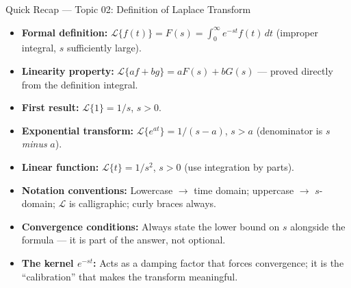 \documentclass[12pt,a4paper]{article}
\begin{document}
\begin{learnbox}{Quick Recap --- Topic 02: Definition of Laplace Transform}
\begin{itemize}[leftmargin=1.2cm]
  \item \textbf{Formal definition:}
        $\mathcal{L}\{f(t)\} = F(s) = \int_0^\infty e^{-st} f(t)\, dt$
        (improper integral, $s$ sufficiently large).
  \item \textbf{Linearity property:}
        $\mathcal{L}\{af + bg\} = aF(s) + bG(s)$ --- proved directly from the
        definition integral.
  \item \textbf{First result:}
        $\mathcal{L}\{1\} = 1/s$, \; $s > 0$.
  \item \textbf{Exponential transform:}
        $\mathcal{L}\{e^{at}\} = 1/(s-a)$, \; $s > a$
        (denominator is $s$ \emph{minus} $a$).
  \item \textbf{Linear function:}
        $\mathcal{L}\{t\} = 1/s^2$, \; $s > 0$
        (use integration by parts).
  \item \textbf{Notation conventions:}
        Lowercase $\to$ time domain; uppercase $\to$ $s$-domain;
        $\mathcal{L}$ is calligraphic; curly braces always.
  \item \textbf{Convergence conditions:}
        Always state the lower bound on $s$ alongside the formula --- it is
        part of the answer, not optional.
  \item \textbf{The kernel $e^{-st}$:}
        Acts as a damping factor that forces convergence;
        it is the ``calibration'' that makes the transform meaningful.
\end{itemize}
\end{learnbox}
\end{document}

